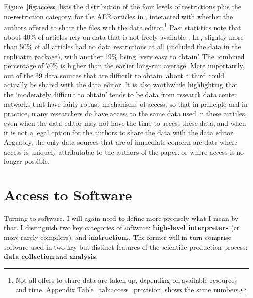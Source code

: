 \documentclass{article}
\begin{document}


Figure~\ref{fig:access} lists the distribution of the four levels of restrictions plus  the no-restriction category, for the \aerpapers{} AER articles in \aeryear{}, interacted with whether the authors offered to share the files with the data editor.\footnote{Not all offers to share data are taken up, depending on available resources and time. Appendix Table~\ref{tab:access_provision} shows the same numbers.}  
%
Past statistics note that about 40\% of articles rely on data that is not freely available \parencite{herbert_reproduce_2024,einav_economics_2014}. 
%
In \aeryear{}, slightly more than 50\% of all articles had no data restrictions at all (included the data in the replicatin package), with another 19\% being `very easy to obtain'. The combined percentage of 70\% is higher than the earlier long-run average.  More importantly, out of the 39 data sources that are difficult to obtain, about a third could actually be shared with the data editor. It is also worthwhile highlighting that the `moderately difficult to obtain' tends to be data from research data center networks that have fairly robust mechanisms of access, so that in principle and in practice, many researchers do have access to the same data used in these articles, even when the data editor may not have the time to access these data, and when it is not a legal option for the authors to share the data with the data editor. Arguably, the only data sources that are of immediate concern are data where access is uniquely attributable to the authors of the paper, or where access is no longer possible.










\section{Access to Software}
\label{sec:software}

Turning to software, I will again need to define more precisely what I mean by that. I distinguish two key categories of software: \textbf{high-level interpreters} (or more rarely compilers), and \textbf{instructions}. The former will in turn comprise software used in two key but distinct features of the scientific production process: \textbf{data collection} and \textbf{analysis}. 
\end{document}
